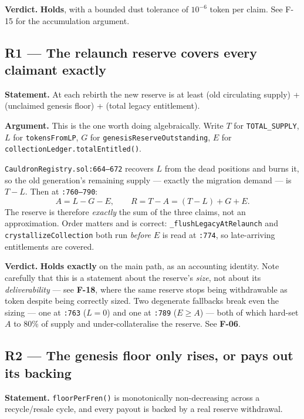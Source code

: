 \documentclass[11pt,a4paper]{article}
\newcommand{\code}[1]{\texttt{\small #1}}
\newcommand{\fileref}[1]{\texttt{\scriptsize #1}}
\begin{document}
\textbf{Verdict.} \textcolor{good}{\textbf{Holds}}, with a bounded dust tolerance
of $10^{-6}$ token per claim. See F-15 for the accumulation argument.

\subsection*{R1 --- The relaunch reserve covers every claimant exactly}
\textbf{Statement.} At each rebirth the new reserve is at least (old circulating
supply) + (unclaimed genesis floor) + (total legacy entitlement).

\textbf{Argument.} This is the one worth doing algebraically. Write
$T$ for \code{TOTAL\_SUPPLY}, $L$ for \code{tokensFromLP}, $G$ for
\code{genesisReserveOutstanding}, $E$ for \code{collectionLedger.totalEntitled()}.

\fileref{CauldronRegistry.sol:664--672} recovers $L$ from the dead positions and
burns it, so the old generation's remaining supply --- exactly the migration
demand --- is $T - L$. Then at \fileref{:760--790}:
\[
  A = L - G - E, \qquad R = T - A = (T - L) + G + E.
\]
The reserve is therefore \emph{exactly} the sum of the three claims, not an
approximation. Order matters and is correct: \code{\_flushLegacyAtRelaunch} and
\code{crystallizeCollection} both run \emph{before} $E$ is read at
\fileref{:774}, so late-arriving entitlements are covered.

\textbf{Verdict.} \textcolor{good}{\textbf{Holds exactly}} on the main path, as
an accounting identity. Note carefully that this is a statement about the reserve's
\emph{size}, not about its \emph{deliverability} --- see \textbf{F-18}, where the
same reserve stops being withdrawable as token despite being correctly sized.
\textcolor{medium}{Two degenerate fallbacks break even the sizing} --- one at \fileref{:763}
($L = 0$) and one at \fileref{:789} ($E \geq A$) --- both of which hard-set
$A$ to 80\% of supply and under-collateralise the reserve. See \textbf{F-06}.

\subsection*{R2 --- The genesis floor only rises, or pays out its backing}
\textbf{Statement.} \code{floorPerFren()} is monotonically non-decreasing across a
recycle/resale cycle, and every payout is backed by a real reserve withdrawal.
\end{document}
